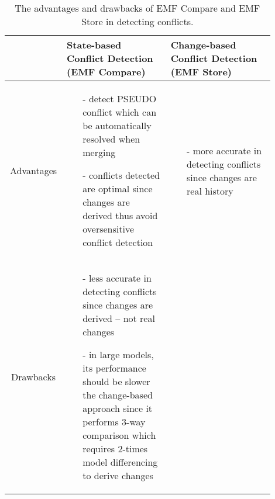 \begin{table}[]
  \centering
  \caption{The advantages and drawbacks of EMF Compare and EMF Store in detecting conflicts.}
  \label{tab:accuracy_emfcompare_emfstore}
\begin{tabular}{|p{0.14\linewidth}|p{0.38\linewidth}|p{0.38\linewidth}|}
    \hline
    & \textbf{State-based Conflict Detection (EMF Compare)}
    & \textbf{Change-based Conflict Detection (EMF Store)}\\
    \hline
    \multicolumn{1}{|c|}{Advantages}
    &
    \begin{minipage}[t]{\linewidth}
    \raggedright
    \begin{itemize}[leftmargin=9pt]
      \setlength\itemsep{2pt}
      \item[-] detect \textsf{PSEUDO} conflict which can be automatically resolved when merging
      \item[-] conflicts detected are optimal since changes are derived thus avoid oversensitive conflict detection
      \item[]
    \end{itemize}
    \end{minipage}
    &
    \begin{minipage}[t]{\linewidth}
      \raggedright
    \begin{itemize}[leftmargin=9pt]
      \setlength\itemsep{2pt}
      \item[-] more accurate in detecting conflicts since changes are real history
      \item[]
    \end{itemize} 
  \end{minipage}
    \\ 
    \hline
    \multicolumn{1}{|c|}{Drawbacks}
    &
    \begin{minipage}[t]{\linewidth}
      \raggedright
    \begin{itemize}[leftmargin=9pt]
      \setlength\itemsep{2pt}
      \item[-] less accurate in detecting conflicts since changes are derived -- not real changes
      \item[-] in large models, its performance should be slower the change-based approach since it performs 3-way comparison which requires 2-times model differencing to derive changes 
      \item[]
    \end{itemize}
    \end{minipage}
    &
    \begin{minipage}[t]{\linewidth}

\end{minipage}
\end{tabular}
\end{table}
